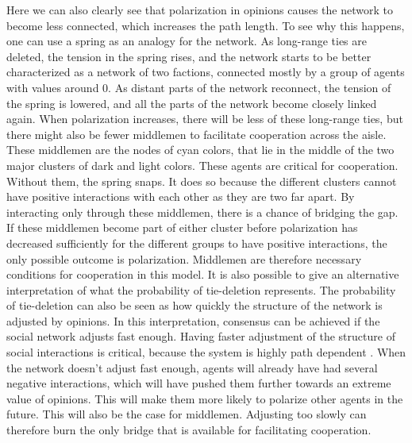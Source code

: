 \documentclass{article}
\begin{document}
Here we can also clearly see that polarization in opinions causes the network to become less connected, which increases the path length. To see why this happens, one can use a spring as an analogy for the network. As long-range ties are deleted, the tension in the spring rises, and the network starts to be better characterized as a network of two factions, connected mostly by a group of agents with values around 0. As distant parts of the network reconnect, the tension of the spring is lowered, and all the parts of the network become closely linked again. When polarization increases, there will be less of these long-range ties, but there might also be fewer middlemen to facilitate cooperation across the aisle. These middlemen are the nodes of cyan colors, that lie in the middle of the two major clusters of dark and light colors. These agents are critical for cooperation. Without them, the spring snaps. It does so because the different clusters cannot have positive interactions with each other as they are two far apart. By interacting only through these middlemen, there is a chance of bridging the gap. If these middlemen become part of either cluster before polarization has decreased sufficiently for the different groups to have positive interactions, the only possible outcome is polarization. Middlemen are therefore necessary conditions for cooperation in this model. 
It is also possible to give an alternative interpretation of what the probability of tie-deletion represents. The probability of tie-deletion can also be seen as how quickly the structure of the network is adjusted by opinions. In this interpretation, consensus can be achieved if the social network adjusts fast enough. Having faster adjustment of the structure of social interactions is critical, because the system is highly path dependent \cite{turner_paths_2018}.  When the network doesn’t adjust fast enough, agents will already have had several negative interactions, which will have pushed them further towards an extreme value of opinions. This will make them more likely to polarize other agents in the future. This will also be the case for middlemen. Adjusting too slowly can therefore burn the only bridge that is available for facilitating cooperation.  
\end{document}
